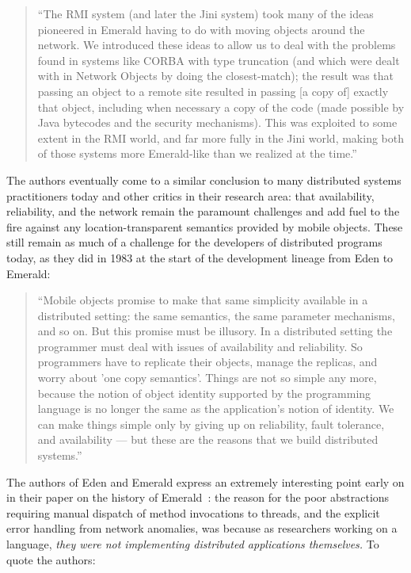 \begin{quote}
``The RMI system (and later the Jini system) took many of the ideas pioneered in Emerald having to do with moving objects around the network. We introduced these ideas to allow us to deal with the problems found in systems like CORBA with type truncation (and which were dealt with in Network Objects by doing the closest-match); the result was that passing an object to a remote site resulted in passing [a copy of] exactly that object, including when necessary a copy of the code (made possible by Java bytecodes and the security mechanisms). This was exploited to some extent in the RMI world, and far more fully in the Jini world, making both of those systems more Emerald-like than we realized at the time.''~\cite{black2007development}
\end{quote}

The authors eventually come to a similar conclusion to many distributed systems practitioners today and other critics in their research area: that availability, reliability, and the network remain the paramount challenges and add fuel to the fire against any location-transparent semantics provided by mobile objects.  These still remain as much of a challenge for the developers of distributed programs today, as they did in 1983 at the start of the development lineage from Eden to Emerald:

\begin{quote}
``Mobile objects promise to make that same simplicity available in a distributed setting: the same semantics, the same parameter mechanisms, and so on.  But this promise must be illusory. In a distributed setting the programmer must deal with issues of availability and reliability. So programmers have to replicate their objects, manage the replicas, and worry about 'one copy semantics'. Things are not so simple any more, because the notion of object identity supported by the programming language is no longer the same as the application’s notion of identity. We can make things simple only by giving up on reliability, fault tolerance, and availability — but these are the reasons that we build distributed systems.''~\cite{black2007development}
\end{quote}

The authors of Eden and Emerald express an extremely interesting point early on in their paper on the history of Emerald~\cite{black2007development}: the reason for the poor abstractions requiring manual dispatch of method invocations to threads, and the explicit error handling from network anomalies, was because as researchers working on a language, \textit{they were not implementing distributed applications themselves.}  To quote the authors:

